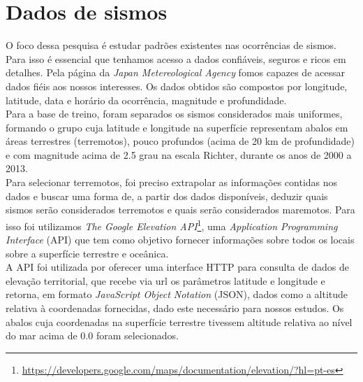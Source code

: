 \section{Dados de sismos}
O foco dessa pesquisa é estudar padrões existentes nas ocorrências de sismos. Para isso é essencial que tenhamos acesso a dados confiáveis, seguros e ricos em detalhes. Pela página da {\it Japan Metereological Agency} fomos capazes de acessar dados fiéis aos nossos interesses. Os dados obtidos são compostos por longitude, latitude, data e horário da ocorrência, magnitude e profundidade. \\

Para a base de treino, foram separados os sismos considerados mais uniformes, formando o grupo cuja latitude e longitude na superfície representam abalos em áreas terrestres (terremotos), pouco profundos (acima de 20 km de profundidade) e com magnitude acima de 2.5 grau na escala Richter, durante os anos de 2000 a 2013.\\

Para selecionar terremotos, foi preciso extrapolar as informações contidas nos dados e buscar uma forma de, a partir dos dados disponíveis, deduzir quais sismos serão considerados terremotos e quais serão considerados maremotos. Para isso foi utilizamos {\it The Google Elevation API}\footnote[3]{\url {https://developers.google.com/maps/documentation/elevation/?hl=pt-es}}, uma {\it Application Programming Interface} (API) que tem como objetivo fornecer informações sobre todos os locais sobre a superfície terrestre e oceânica. \\

A API foi utilizada por oferecer uma interface HTTP para consulta de dados de elevação territorial, que recebe via url os parâmetros latitude e longitude e retorna, em formato {\it JavaScript Object Notation} (JSON), dados como a altitude relativa à coordenadas fornecidas, dado este necessário para nossos estudos. Os abalos cuja coordenadas na superfície terrestre tivessem altitude relativa ao nível do mar acima de 0.0 foram selecionados.\\

